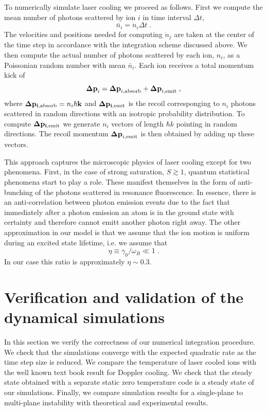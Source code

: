 \documentclass[aps, pra, preprint]{revtex4-1}
\begin{document}
To numerically simulate laser cooling we proceed as follows.
First we compute the mean number of photons scattered by ion $i$
in time interval $\Delta t$,
\begin{equation}
\bar{n}_i=\dot{n}_i \Delta t\;.
\end{equation}
The velocities and positions needed for computing $\dot{n}_j$ are taken
at the center of the time step in accordance with the integration scheme
discussed above.  We then compute the actual number of photons scattered
by each ion, $n_i$,  as a Poissonian random number with mean $\bar{n}_i$.  Each
ion receives a total momentum kick of 
\begin{equation}
\mathbf{\Delta p}_i = \mathbf{\Delta p}_{i,{\rm absorb}} + 
\mathbf{\Delta p}_{i,{\rm emit}}\;,
\end{equation}
where $\mathbf{\Delta p_{i,{\rm absorb}}}=n_i \hbar \mathbf{k}$ and
$\mathbf{\Delta p_{i,{\rm emit}}}$ is the recoil corresponging to $n_i$
photons scattered in random directions with an isotropic
probability distribution. To compute $\mathbf{\Delta
p_{i,{\rm emit}}}$ we generate $n_i$ vectors of length $\hbar k$
pointing in random directions.  The recoil momentum $\mathbf{\Delta
p}_{i,{\rm emit}}$ is then obtained by adding up these vectors.

This approach captures the microscopic physics of laser cooling
except for two phenomena. First, in the case of strong
saturation, $S\gtrsim 1$, quantum statistical phenomena start to
play a role. These manifest themselves in the form of
anti-bunching of the photons scattered in resonance fluorescence.
In essence, there is an anti-correlation between photon emission
events due to the fact that immediately after a photon emission
an atom is in the ground state with certainty and therefore
cannot emitt another photon right away. The other approximation
in our model is that we assume that the ion motion is uniform
during an excited state lifetime, i.e. we assume that
\begin{equation}
\eta\equiv\gamma_0/\omega_B\ll 1\;.
\end{equation}
In our case this ratio is approximately $\eta \sim 0.3$.



\section{Verification and validation of the dynamical
simulations}
\label{sec:VerificationAndValidation}

In this section we verify the correctness of our numerical
integration procedure. We check that the simulations converge
with the expected quadratic rate as the time step size is
reduced. We compare the temperature of laser cooled ions with the
well known text book result for Doppler cooling. We check that
the steady state obtained with a separate static zero temperature
code is a steady state of our simulations. Finally, we compare
simulation results for a single-plane to multi-plane instability
with theoretical and experimental results.
\end{document}
